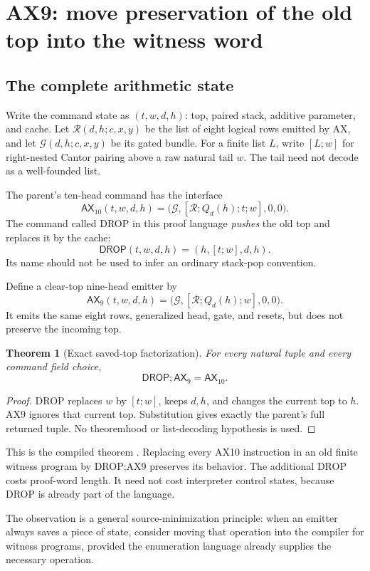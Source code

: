 \documentclass[11pt]{article}
\newtheorem{theorem}{Theorem}[section]
\newcommand{\AX}{\mathsf{AX}}
\newcommand{\DROP}{\mathsf{DROP}}
\newcommand{\code}[1]{\texttt{\detokenize{#1}}}
\begin{document}
\section{AX9: move preservation of the old top into the witness word}

\subsection{The complete arithmetic state}

Write the command state as $(t,w,d,h)$: top, paired stack, additive parameter, and cache. Let $\mathcal R(d,h;c,x,y)$ be the list of eight logical rows emitted by AX, and let $\mathcal G(d,h;c,x,y)$ be its gated bundle. For a finite list $L$, write $[L;w]$ for right-nested Cantor pairing above a raw natural tail $w$. The tail need not decode as a well-founded list.

The parent's ten-head command has the interface
\[
 \AX_{10}(t,w,d,h)
   =\bigl(\mathcal G,[\mathcal R;Q_d(h);t;w],0,0\bigr).
\]
The command called DROP in this proof language \emph{pushes} the old top and replaces it by the cache:
\[
 \DROP(t,w,d,h)=(h,[t;w],d,h).
\]
Its name should not be used to infer an ordinary stack-pop convention.

Define a clear-top nine-head emitter by
\[
 \AX_9(t,w,d,h)
   =\bigl(\mathcal G,[\mathcal R;Q_d(h);w],0,0\bigr).
\]
It emits the same eight rows, generalized head, gate, and resets, but does not preserve the incoming top.

\begin{theorem}[Exact saved-top factorization]
For every natural tuple and every command field choice,
\[
 \DROP;\AX_9=\AX_{10}.
\]
\end{theorem}
\begin{proof}
DROP replaces $w$ by $[t;w]$, keeps $d,h$, and changes the current top to $h$. AX9 ignores that current top. Substitution gives exactly the parent's full returned tuple. No theoremhood or list-decoding hypothesis is used.
\end{proof}
This is the compiled theorem \code{ax10_factor}. Replacing every AX10 instruction in an old finite witness program by DROP;AX9 preserves its behavior. The additional DROP costs proof-word length. It need not cost interpreter control states, because DROP is already part of the language.

The observation is a general source-minimization principle: when an emitter always saves a piece of state, consider moving that operation into the compiler for witness programs, provided the enumeration language already supplies the necessary operation.
\end{document}
